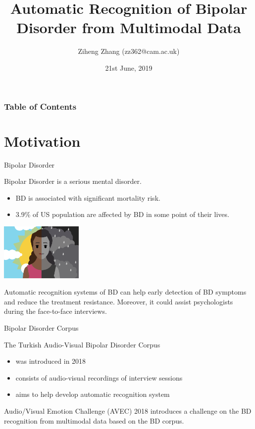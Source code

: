 \documentclass{beamer}
\title[BD recognition] %
{Automatic Recognition of Bipolar Disorder from Multimodal Data}
\author[Ziheng Zhang (zz362)] %
{Ziheng Zhang (zz362@cam.ac.uk)}
\date[21st June, 2019] %
{21st June, 2019}
\begin{document}
\frame{\titlepage}


\begin{frame}
\frametitle{Table of Contents}
\tableofcontents
\end{frame}


\section{Motivation}

\begin{frame}{Bipolar Disorder}

Bipolar Disorder is a serious mental disorder.
\begin{itemize}
    \item BD is associated with significant mortality risk.
    \item 3.9\% of US population are affected by BD in some point of their lives.
\end{itemize}

{
\centering
\includegraphics[width=4cm]{images/bd.png}
}

Automatic recognition systems of BD can help early detection of BD symptoms and reduce the treatment resistance. Moreover, it could assist psychologists during the face-to-face interviews.

\end{frame}

\begin{frame}{Bipolar Disorder Corpus}

The Turkish Audio-Visual Bipolar Disorder Corpus
\begin{itemize}
\item was introduced in 2018 
\item consists of audio-visual recordings of interview sessions
\item aims to help develop automatic recognition system
\end{itemize}

Audio/Visual Emotion Challenge (AVEC) 2018 introduces a challenge on the BD recognition from multimodal data based on the BD corpus. 

\end{frame}
\end{document}
